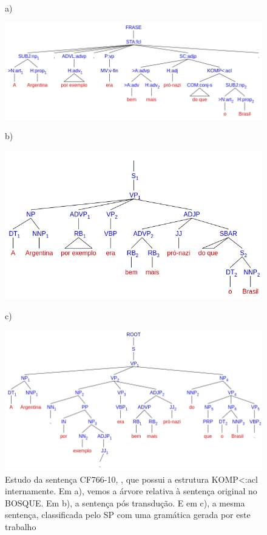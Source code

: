 \begin{figure}[!hb]
    \centering
    a)
    \begin{minipage}{.45\textwidth}
        \includegraphics[width=\linewidth]{imagens/ec_bosque_komp_tree_orig.png}
    \end{minipage}
    b)
    \begin{minipage}{.45\textwidth}
        \includegraphics[width=\linewidth]{imagens/ec_bosque_komp_tree_trans.png}
    \end{minipage}
    c)
    \begin{minipage}{.45\textwidth}
        \includegraphics[width=\linewidth]{imagens/ec_bosque_komp_tree_sp.png}
    \end{minipage}

    \caption[Estudo de caso BOSQUE - Sentença transduzida com KOMP<:acl]{Estudo da sentença CF766-10, , que possui a estrutura KOMP<:acl internamente. Em a), vemos a árvore relativa à sentença original no BOSQUE. Em b), a sentença pós transdução. E em c), a mesma sentença, classificada pelo SP com uma gramática gerada por este trabalho}
    \label{fig:ec_bosque_komp_tree}
\end{figure}